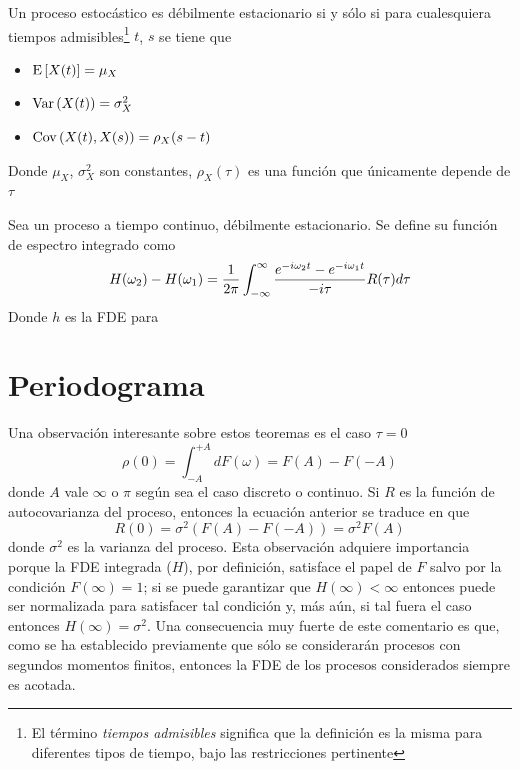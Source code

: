 \begin{definicion}
Un proceso estocástico \xt es débilmente estacionario si y sólo si para cualesquiera tiempos 
admisibles\footnote{El término \textit{tiempos admisibles} significa que la definición es la misma
para diferentes tipos de tiempo, bajo las restricciones pertinente} $t$, $s$ se tiene que
\begin{itemize}
\item $\mathrm{E}\left[ X(t) \right] = \mu_X$
\item $\mathrm{Var}\left( X(t) \right) = \sigma^{2}_X$
\item $\mathrm{Cov}\left( X(t),X(s) \right) = \rho_X (s-t)$
\end{itemize}
Donde $\mu_X$, $\sigma^{2}_X$ son constantes, $\rho_X(\tau)$ es una función que únicamente 
depende de $\tau$
\label{est_orden_primera}
\end{definicion}

\begin{definicion}
Sea \xt un proceso a tiempo continuo, débilmente estacionario. Se define su
función de espectro integrado como
\begin{equation*}
H(\omega_2) - H(\omega_1) = 
\frac{1}{2 \pi} \int_{-\infty}^{\infty} \frac{e^{- i \omega_2 t}-e^{- i \omega_1 t}}{- i \tau} R(\tau) d\tau
\end{equation*}
Donde $h$ es la FDE para \xt
\end{definicion}

\section{Periodograma}

Una observaci\'on interesante sobre estos teoremas es el caso $\tau = 0$
\begin{equation*}
\rho(0) = \int_{-A}^{+A} dF(\omega) = F(A) - F(-A)
\end{equation*}
donde $A$ vale $\infty$ o $\pi$ seg\'un sea el caso discreto o continuo. Si $R$ es la funci\'on de
autocovarianza del proceso, entonces la ecuaci\'on anterior se traduce en que
\begin{equation*}
R(0) = \sigma^{2} \left( F(A) - F(-A) \right) = \sigma^{2} F(A)
\end{equation*}
donde $\sigma^{2}$ es la varianza del proceso. 
Esta observaci\'on adquiere importancia porque la FDE integrada ($H$), por definici\'on, satisface 
el papel de $F$ salvo por la condici\'on $F(\infty)=1$; si se puede garantizar que 
$H(\infty)<\infty$ entonces puede ser normalizada para satisfacer tal condici\'on y, m\'as a\'un,
si tal fuera el caso entonces $H(\infty)=\sigma^{2}$. Una consecuencia muy fuerte de este 
comentario es que, como se ha establecido previamente que s\'olo se considerar\'an procesos con
segundos momentos finitos, entonces la FDE de los procesos considerados siempre es acotada.


